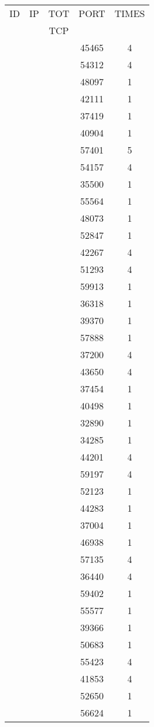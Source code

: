 \documentclass[a4paper]{scrartcl}
\begin{document}
\begin{minipage}[b]{0.5\linewidth}
\begin{tabular}{| c | c | c | c | c |}
\hline
ID & IP & TOT & PORT & TIMES \\ 
   &    & TCP &      &       \\ 
\hline
& & & 45465 & 4 \\ & & & 54312 & 4 \\ & & & 48097 & 1 \\ & & & 42111 & 1 \\ & & & 37419 & 1 \\ & & & 40904 & 1 \\ & & & 57401 & 5 \\ & & & 54157 & 4 \\ & & & 35500 & 1 \\ & & & 55564 & 1 \\ & & & 48073 & 1 \\ & & & 52847 & 1 \\ & & & 42267 & 4 \\ & & & 51293 & 4 \\ & & & 59913 & 1 \\ & & & 36318 & 1 \\ & & & 39370 & 1 \\ & & & 57888 & 1 \\ & & & 37200 & 4 \\ & & & 43650 & 4 \\ & & & 37454 & 1 \\ & & & 40498 & 1 \\ & & & 32890 & 1 \\ & & & 34285 & 1 \\ & & & 44201 & 4 \\ & & & 59197 & 4 \\ & & & 52123 & 1 \\ & & & 44283 & 1 \\ & & & 37004 & 1 \\ & & & 46938 & 1 \\ & & & 57135 & 4 \\ & & & 36440 & 4 \\ & & & 59402 & 1 \\ & & & 55577 & 1 \\ & & & 39366 & 1 \\ & & & 50683 & 1 \\ & & & 55423 & 4 \\ & & & 41853 & 4 \\ & & & 52650 & 1 \\ & & & 56624 & 1 \\ \hline\end{tabular}\end{minipage} \hfill\begin{minipage}[b]{0.5\linewidth}\begin{tabular}{| c | c | c | c | c |}

\end{tabular}
\end{minipage}
\end{document}
